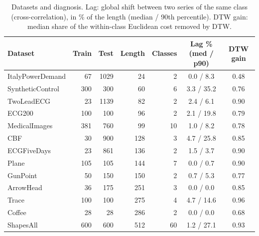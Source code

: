\begin{table}[t]
\centering\small
\caption{Datasets and diagnosis. Lag: global shift between two series of the same class (cross-correlation), in \% of the length (median / 90th percentile). DTW gain: median share of the within-class Euclidean cost removed by DTW.}
\label{tab:data}
\begin{tabular}{lrrrrcc}
\toprule
Dataset & Train & Test & Length & Classes & Lag \% (med / p90) & DTW gain \\
\midrule
ItalyPowerDemand & 67 & 1029 & 24 & 2 & 0.0 / 8.3 & 0.48 \\
SyntheticControl & 300 & 300 & 60 & 6 & 3.3 / 35.2 & 0.76 \\
TwoLeadECG & 23 & 1139 & 82 & 2 & 2.4 / 6.1 & 0.90 \\
ECG200 & 100 & 100 & 96 & 2 & 2.1 / 19.8 & 0.79 \\
MedicalImages & 381 & 760 & 99 & 10 & 1.0 / 8.2 & 0.78 \\
CBF & 30 & 900 & 128 & 3 & 4.7 / 25.8 & 0.85 \\
ECGFiveDays & 23 & 861 & 136 & 2 & 1.5 / 3.7 & 0.90 \\
Plane & 105 & 105 & 144 & 7 & 0.0 / 0.7 & 0.90 \\
GunPoint & 50 & 150 & 150 & 2 & 0.7 / 5.3 & 0.77 \\
ArrowHead & 36 & 175 & 251 & 3 & 0.0 / 0.0 & 0.85 \\
Trace & 100 & 100 & 275 & 4 & 4.7 / 14.6 & 0.96 \\
Coffee & 28 & 28 & 286 & 2 & 0.0 / 0.0 & 0.68 \\
ShapesAll & 600 & 600 & 512 & 60 & 1.2 / 27.1 & 0.93 \\
\bottomrule
\end{tabular}
\end{table}
